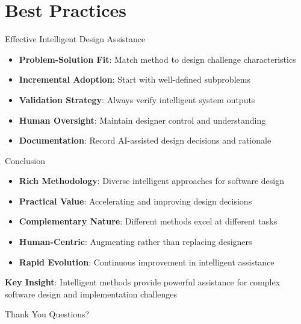 \documentclass{beamer}
\begin{document}
\section{Best Practices}
\begin{frame}[t]{Effective Intelligent Design Assistance}
\begin{itemize}
\item \textbf{Problem-Solution Fit}: Match method to design challenge characteristics
\item \textbf{Incremental Adoption}: Start with well-defined subproblems
\item \textbf{Validation Strategy}: Always verify intelligent system outputs
\item \textbf{Human Oversight}: Maintain designer control and understanding
\item \textbf{Documentation}: Record AI-assisted design decisions and rationale
\end{itemize}
\end{frame}

\begin{frame}[t]{Conclusion}
\begin{itemize}
\item \textbf{Rich Methodology}: Diverse intelligent approaches for software design
\item \textbf{Practical Value}: Accelerating and improving design decisions
\item \textbf{Complementary Nature}: Different methods excel at different tasks
\item \textbf{Human-Centric}: Augmenting rather than replacing designers
\item \textbf{Rapid Evolution}: Continuous improvement in intelligent assistance
\end{itemize}

\vspace{0.5cm}
\textbf{Key Insight}: Intelligent methods provide powerful assistance for complex software design and implementation challenges
\end{frame}

\begin{frame}[t]
\centering
\Huge{Thank You}
\vspace{1cm}
\normalsize
Questions?
\end{frame}
\end{document}
